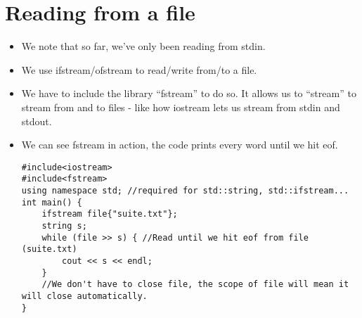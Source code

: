 \documentclass{article}
\begin{document}
\section{Reading from a file}
\begin{itemize}
\item We note that so far, we've only been reading from stdin.
\item We use ifstream/ofstream to read/write from/to a file.
\item We have to include the library ``fstream'' to do so.  It allows us to ``stream'' to stream from and to files - like how iostream lets us stream from stdin and stdout.
\item We can see fstream in action, the code prints every word until we hit eof.
\begin{lstlisting}
#include<iostream>
#include<fstream>
using namespace std; //required for std::string, std::ifstream...
int main() {
    ifstream file{"suite.txt"};
    string s;
    while (file >> s) { //Read until we hit eof from file (suite.txt)
        cout << s << endl;
    }
    //We don't have to close file, the scope of file will mean it will close automatically.
}
\end{lstlisting}
\end{itemize}
\end{document}
